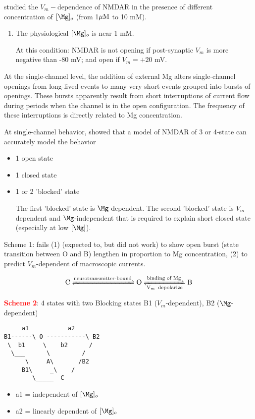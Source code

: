 \citep{jahr1990}  studied the $V_m-$dependence of NMDAR in the presence of
different concentration of $[\Mg]_o$ (from 1${\mu\text{M}}$ to 10 mM).
\begin{enumerate}
  \item The physiological $[\Mg]_o$ is near 1 mM.

  At this condition: NMDAR is not opening if post-synaptic $V_m$ is more
  negative than -80 mV; and open if $V_m = +20$ mV.


\end{enumerate}
At the single-channel level, the addition of external Mg alters single-channel
openings from long-lived events to many very short events grouped into bursts of
openings. These bursts apparently result from short interruptions of current
flow during periods when the channel is in the open configuration.
The frequency of these interruptions is directly related to Mg concentration.


At single-channel behavior, \citep{jahr1990b} showed that
a model of NMDAR of 3 or 4-state can accurately model the behavior
\begin{itemize}
  \item 1 open state
  \item 1 closed state
  \item 1 or 2 'blocked' state

  The first 'blocked' state is $\Mg$-dependent.
  The second 'blocked' state is $V_m$-dependent and $\Mg$-independent that is
  required to explain short closed state (especially at low $[\Mg]$).

\end{itemize}

Scheme 1: fails (1) (expected to, but did not work) to show open burst (state
transition between O and B) lengthen in proportion to Mg concentration, (2)
to predict $V_m$-dependent of macroscopic currents.

\begin{equation}
\ce{C <=>[\text{neurotransmitter-bound}] O <=>[\text{binding of Mg}][V_m
\text{ depolarize}] B}
\end{equation}

\textcolor{red}{\bf Scheme 2}: 4 states with two Blocking states B1
($V_m$-dependent), B2 ($\Mg$-dependent)
\begin{verbatim}
     a1           a2
B1------\ O -----------\ B2
 \  b1     \    b2      /
  \___      \         /
      \     A\       /B2
     B1\     _\    /
        \_____  C
\end{verbatim}
\begin{itemize}
  \item a1 = independent of $[\Mg]_o$

  \item a2 = linearly dependent of $[\Mg]_o$
\end{itemize}

